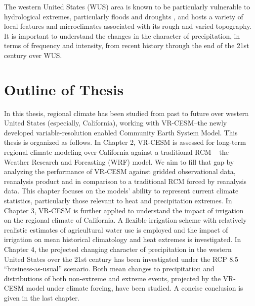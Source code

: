 The western United States (WUS) area is known to be particularly vulnerable to hydrological extremes, particularly floods and droughts \cite{leung2003hydroclimate, caldwell2010california}, and hosts a variety of local features and microclimates associated with its rough and varied topography. It is important to understand the changes in the character of precipitation, in terms of frequency and intensity, from recent history through the end of the 21st century over WUS.

\section{Outline of Thesis}

In this thesis, regional climate has been studied from past to future over western United States (especially, California), working with VR-CESM--the newly developed variable-resolution enabled Community Earth System Model. This thesis is organized as follows. In Chapter 2, VR-CESM is assessed for long-term regional climate modeling over California against a traditional RCM -- the Weather Research and Forcasting (WRF) model. We aim to fill that gap by analyzing the performance of VR-CESM against gridded observational data, reanalysis product and in comparison to a traditional RCM forced by reanalysis data. This chapter focuses on the models' ability to represent current climate statistics, particularly those relevant to heat and precipitation extremes. In Chapter 3, VR-CESM is further applied to understand the impact of irrigation on the regional climate of California. A flexible irrigation scheme with relatively realistic estimates of agricultural water use is employed and the impact of irrigation on mean historical climatology and heat extremes is investigated. In Chapter 4, the projected changing character of precipitation in the western United States over the 21st century has been investigated under the RCP 8.5 ``business-as-usual'' scenario. Both mean changes to precipitation and distributions of both non-extreme and extreme events, projected by the VR-CESM model under climate forcing, have been studied. A concise conclusion is given in the last chapter.
